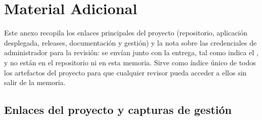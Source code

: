 \chapter{Material Adicional}
\label{anx:material}

Este anexo recopila los enlaces principales del proyecto (repositorio, aplicación desplegada, releases, documentación y gestión) y la nota sobre las credenciales de administrador para la revisión: se envían junto con la entrega, tal como indica el , y no están en el repositorio ni en esta memoria. Sirve como índice único de todos los artefactos del proyecto para que cualquier revisor pueda acceder a ellos sin salir de la memoria.

\section{Enlaces del proyecto y capturas de gestión}

